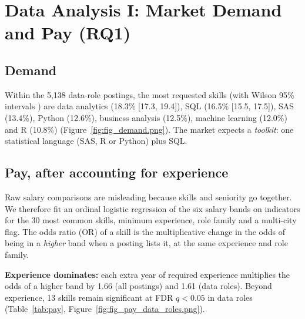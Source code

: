 \section{Data Analysis I: Market Demand and Pay (RQ1)}\label{sec:rq1}

\subsection{Demand}

Within the 5,138 data-role postings, the most requested skills (with Wilson 95\% intervals
\citep{wilson1927}) are data analytics (18.3\% [17.3, 19.4]), SQL (16.5\% [15.5, 17.5]), SAS (13.4\%),
Python (12.6\%), business analysis (12.5\%), machine learning (12.0\%) and R (10.8\%)
(Figure~\ref{fig:fig_demand.png}). The market expects a \emph{toolkit}: one statistical language
(SAS, R or Python) plus SQL.


\subsection{Pay, after accounting for experience}

Raw salary comparisons are misleading because skills and seniority go together. We therefore fit an
ordinal logistic regression of the six salary bands on indicators for the 30 most common skills,
minimum experience, role family and a multi-city flag. The odds ratio (OR) of a skill is the
multiplicative change in the odds of being in a \emph{higher} band when a posting lists it, at the
same experience and role family.

\textbf{Experience dominates:} each extra year of required experience multiplies the odds of a
higher band by 1.66 (all postings) and 1.61 (data roles). Beyond experience, 13 skills remain
significant at FDR $q<0.05$ in data roles (Table~\ref{tab:pay}, Figure~\ref{fig:fig_pay_data_roles.png}).

